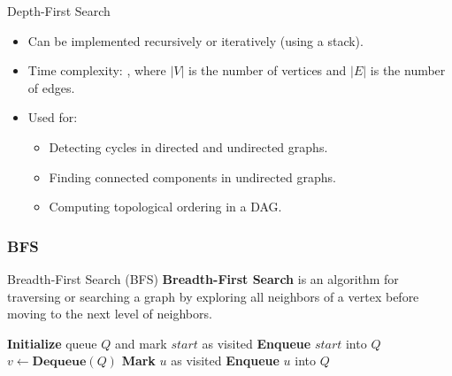 \begin{properties}[]{Depth-First Search}
    \begin{itemize}
        \item Can be implemented recursively or iteratively (using a stack).
        \item Time complexity: , where $|V|$ is the number of vertices and $|E|$ is the number of edges.
        \item Used for:
              \begin{itemize}
                  \item Detecting cycles in directed and undirected graphs.
                  \item Finding connected components in undirected graphs.
                  \item Computing topological ordering in a DAG.
              \end{itemize}
    \end{itemize}
\end{properties}


\subsubsection{BFS}
\begin{definition}[]{Breadth-First Search (BFS)}
    \textbf{Breadth-First Search} is an algorithm for traversing or searching a graph by exploring all neighbors of a vertex before moving to the next level of neighbors.
\end{definition}

\begin{algorithm}
    \caption{Breadth-First Search (Iterative)}
    \begin{algorithmic}[1]
            \State \textbf{Initialize} queue $Q$ and mark $start$ as visited
            \State \textbf{Enqueue} $start$ into $Q$
                \State $v \gets \textbf{Dequeue}(Q)$
                        \State \textbf{Mark} $u$ as visited
                        \State \textbf{Enqueue} $u$ into $Q$
                    \EndIf
                \EndFor
            \EndWhile
        \EndProcedure
    \end{algorithmic}
\end{algorithm}

